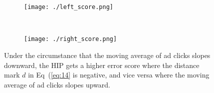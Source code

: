\documentclass[10pt,letterpaper]{article}
\begin{document}
\begin{figure}[t]
\label{fig9}
\begin{adjustwidth}{-2.25in}{0in} %
	\centering
	\begin{subfigure}[b]{0.43\paperwidth}
	\texttt{[image: ./left\_score.png]}\caption{}
	\label{fig9(a)}
	\end{subfigure}
	~
	\begin{subfigure}[b]{0.43\paperwidth}\texttt{[image: ./right\_score.png]}
	\caption{}
	\label{fig9(b)}
	\end{subfigure}
\caption{{Under the circumstance that the moving average of ad clicks slopes downward, the HIP gets a higher error score where the distance mark $d$ in Eq~(\ref{eq:14} is negative, and vice versa where the moving average of ad clicks slopes upward.}}
\end{adjustwidth}
\end{figure}


\end{document}
